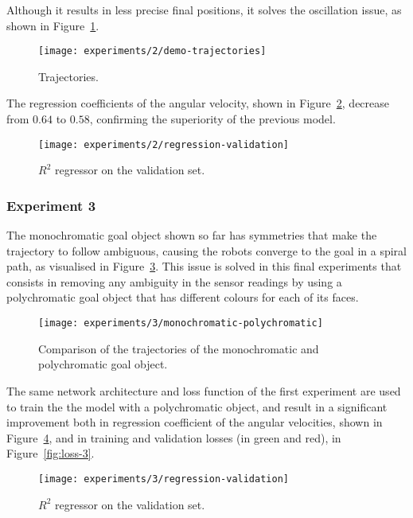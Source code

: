  
Although it results in less precise final positions, it solves the oscillation 
issue, as shown in Figure~\ref{fig:demo-trajectories}.

\begin{figure}[htbp]
	\centerline{\texttt{[image: experiments/2/demo-trajectories]}}
	\caption{Trajectories.}
	\label{fig:demo-trajectories}
\end{figure}

The regression coefficients of the angular velocity, shown in 
Figure~\ref{fig:regression-validation}, decrease from $0.64$ to $0.58$, 
confirming the superiority of the previous model.

\begin{figure}[htbp]
	\centerline{\texttt{[image: experiments/2/regression-validation]}}
	\caption{$R^2$ regressor on the validation set.}
	\label{fig:regression-validation}
\end{figure}

\subsubsection{Experiment 3}
\label{experiment3}

The monochromatic goal object shown so far has symmetries that make the 
trajectory to follow ambiguous, causing the robots converge to the goal in a 
spiral path, as visualised in Figure~\ref{fig:demo-circle-trajectories}.
This issue is solved in this final experiments that consists in removing any 
ambiguity in the sensor readings by using a polychromatic goal object that has 
different colours for each of its faces.

\begin{figure}[htbp]
	\centerline{\texttt{[image: experiments/3/monochromatic-polychromatic]}}
	\caption{Comparison of the trajectories of the monochromatic and 
	polychromatic goal object.}
	\label{fig:demo-circle-trajectories}
\end{figure}

The same network architecture and loss function of the first experiment are 
used to train the the model with a polychromatic object, and result in a 
significant improvement both in regression coefficient of the angular 
velocities, shown in Figure~\ref{fig:regression-3}, and in training and 
validation losses (in green and red), in Figure~\ref{fig:loss-3}.

\begin{figure}[htbp]
	\centerline{\texttt{[image: experiments/3/regression-validation]}}
	\caption{$R^2$ regressor on the validation set.}
	\label{fig:regression-3}
\end{figure}

